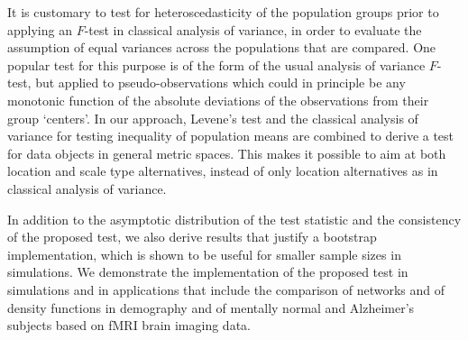 \documentclass[lineno]{biometrika}
\def\bco{\iffalse}
\def\F{Fr\'{e}chet}
\begin{document}
It is customary to test for heteroscedasticity of the population groups prior to applying an $F$-test in classical analysis of variance, in order  to evaluate the assumption of equal variances across the populations that are compared. One popular test for this purpose \citep{leve:60} is of the form of the usual analysis of variance $F$-test, but applied to pseudo-observations which could in principle be any monotonic function of the absolute deviations of the observations from their group ‘centers’. In our approach, Levene's  test and the classical analysis of variance for testing inequality of population means are combined to derive a test for data objects in general metric spaces. This makes it possible to aim at both location and scale type alternatives, instead of only location alternatives as in classical analysis of variance. 

In addition to the asymptotic distribution of the test statistic and the consistency of the proposed test, we also derive results that justify a bootstrap implementation, which is shown to be useful for smaller sample sizes in simulations. We demonstrate the implementation of the proposed test in simulations and in applications that include the comparison of networks and of  density functions in demography and of mentally normal and Alzheimer's subjects based on fMRI brain imaging data.

\bco

 Our test statistic is a sum of two components. One component is proportional to the squared difference of the pooled sample \F \ variance and the weighted
average of the groupwise \F \ variances, with weights proportional to the sample sizes of the groups which for the special case of Euclidean data, is proportional to the squared F-ratio as in the usual ANOVA. A key auxiliary result is that this statistic converges to zero at rate $o_P(1/n)$ under the null hypothesis of equality of \F \ means of population distributions. The other component of our test statistic accounts for differences in the \F \ variances of the population groups and under the Euclidean setting simplifies to a generalization of the Levene’s test applied to squared absolute deviations of the observations from their group \F \ means. It turns out that when the assumptions of the central limit theorem hold and under the null hypothesis of equality of \F \ means and variances of the populations, the asymptotic distribution of our test statistic is $\chi^2_{k-1}$.

\fi
\end{document}
